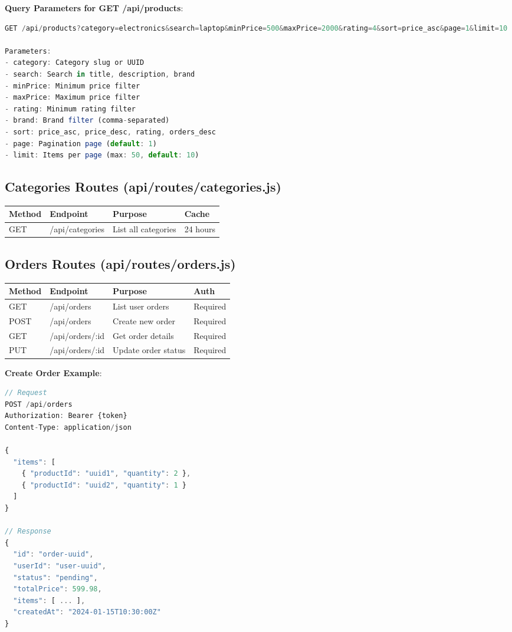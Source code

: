 \documentclass[12pt,a4paper]{report}
\begin{document}
\textbf{Query Parameters for GET /api/products}:
\begin{lstlisting}[language=javascript, caption=Product Filtering Parameters]
GET /api/products?category=electronics&search=laptop&minPrice=500&maxPrice=2000&rating=4&sort=price_asc&page=1&limit=10

Parameters:
- category: Category slug or UUID
- search: Search in title, description, brand
- minPrice: Minimum price filter
- maxPrice: Maximum price filter
- rating: Minimum rating filter
- brand: Brand filter (comma-separated)
- sort: price_asc, price_desc, rating, orders_desc
- page: Pagination page (default: 1)
- limit: Items per page (max: 50, default: 10)
\end{lstlisting}

\subsection{Categories Routes (api/routes/categories.js)}

\begin{longtable}{|p{2cm}|p{2.5cm}|p{3cm}|p{2.5cm}|}
\hline
\textbf{Method} & \textbf{Endpoint} & \textbf{Purpose} & \textbf{Cache} \\
\hline
GET & /api/categories & List all categories & 24 hours \\
\hline
\end{longtable}

\subsection{Orders Routes (api/routes/orders.js)}

\begin{longtable}{|p{2cm}|p{2.5cm}|p{3cm}|p{2.5cm}|}
\hline
\textbf{Method} & \textbf{Endpoint} & \textbf{Purpose} & \textbf{Auth} \\
\hline
GET & /api/orders & List user orders & Required \\
\hline
POST & /api/orders & Create new order & Required \\
\hline
GET & /api/orders/:id & Get order details & Required \\
\hline
PUT & /api/orders/:id & Update order status & Required \\
\hline
\end{longtable}

\textbf{Create Order Example}:
\begin{lstlisting}[language=javascript, caption=Order Creation]
// Request
POST /api/orders
Authorization: Bearer {token}
Content-Type: application/json

{
  "items": [
    { "productId": "uuid1", "quantity": 2 },
    { "productId": "uuid2", "quantity": 1 }
  ]
}

// Response
{
  "id": "order-uuid",
  "userId": "user-uuid",
  "status": "pending",
  "totalPrice": 599.98,
  "items": [ ... ],
  "createdAt": "2024-01-15T10:30:00Z"
}
\end{lstlisting}
\end{document}

